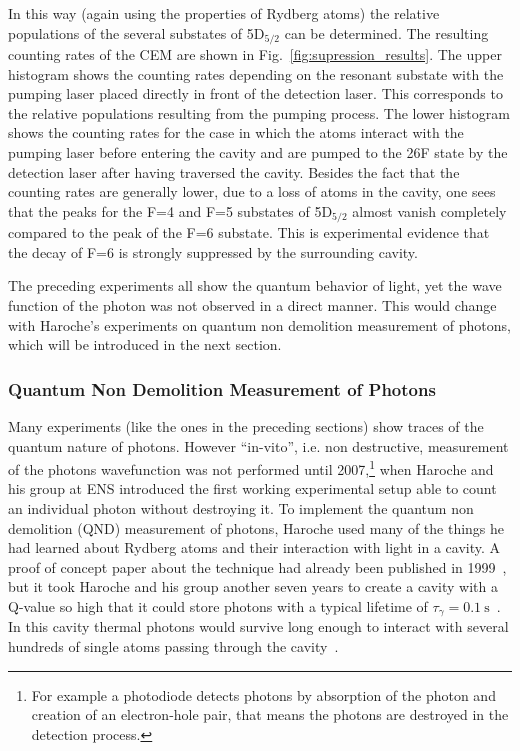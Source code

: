 In this way (again using the properties of Rydberg atoms) the relative
populations of the several substates of 5D$_{5/2}$ can be determined. The
resulting counting rates of the CEM are shown in
Fig.~\ref{fig:supression_results}. The upper histogram shows the counting
rates depending on the resonant substate with the pumping laser placed directly
in front of the
detection laser. This corresponds to the relative populations resulting from the
pumping process. The lower histogram shows the counting rates for the case
in which the atoms interact with the pumping laser before entering the cavity
and are pumped to the 26F state by the detection laser after having traversed the
cavity. Besides the fact that the counting rates are generally lower, due to a
loss of atoms in the cavity, one sees that the peaks for the F=4 and F=5
substates of 5D$_{5/2}$ almost vanish completely compared to the peak of the F=6
substate. This is experimental evidence that the decay of F=6 is strongly
suppressed by the surrounding cavity.

The preceding experiments all show the quantum behavior of light, yet the
wave function of the photon was not observed in a direct manner. This would
change with Haroche's experiments on quantum non demolition measurement of
photons, which will be introduced in the next section.


\subsubsection{Quantum Non Demolition Measurement of Photons}
\label{sec:QND}
Many experiments (like the ones in the preceding sections) show traces of the
quantum nature of photons. However ``in-vito'', i.e. non destructive,
measurement of the photons wavefunction was not performed until
2007,\footnote{For example a photodiode detects photons by absorption of the
  photon and creation of an electron-hole pair, that
means the photons are destroyed in the detection process.} when Haroche and his
group at ENS introduced the first working experimental setup able to count an
individual photon without destroying it. To implement the quantum non demolition
(QND) measurement of photons, Haroche used many of the things he had learned
about Rydberg atoms and their interaction with light in a cavity. A proof of
concept paper about the technique had already been published in 1999~\cite{haroche1999SinglePhoton}, 
but it took Haroche and his group another seven
years to create a cavity with a Q-value so high that it could store photons with
a typical lifetime of $\tau_\gamma = \SI{0.1}{\second}$~\cite{kuhr2006ultrahigh}. 
In this cavity thermal photons would survive long
enough to interact with several hundreds of single atoms passing through the
cavity~\cite{haroche2007QuantumJumps}.


